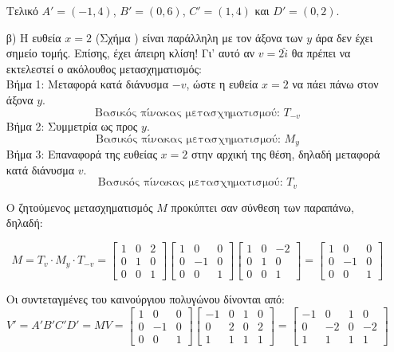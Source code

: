 \begin{solution}
\begin{enumerate}
Τελικό $A' = (-1, 4)$, $B' = (0, 6)$, $C' = (1, 4)$ και $D' = (0, 2)$.

    \item[β)] Η ευθεία $x=2$ (Σχήμα ) είναι παράλληλη με τον άξονα των $y$ άρα δεν έχει σημείο τομής. Επίσης, έχει άπειρη κλίση! Γι' αυτό αν $v = 2\hat{i}$ θα πρέπει να εκτελεστεί ο ακόλουθος μετασχηματισμός:\\
Βήμα 1: Μεταφορά κατά διάνυσμα $-v$, ώστε η ευθεία $x=2$ να πάει πάνω στον άξονα $y$. 
\[
\text{Βασικός πίνακας μετασχηματισμού: } T_{-v}
\]
Βήμα 2: Συμμετρία ως προς $y$.
\[
\text{Βασικός πίνακας μετασχηματισμού: } M_y
\]
Βήμα 3: Επαναφορά της ευθείας $x=2$ στην αρχική της θέση, δηλαδή μεταφορά κατά διάνυσμα $v$.
\[
\text{Βασικός πίνακας μετασχηματισμού: } T_v
\]

Ο ζητούμενος μετασχηματισμός $M$ προκύπτει σαν σύνθεση των παραπάνω, δηλαδή:

\[
M = T_v \cdot M_y \cdot T_{-v} = \begin{bmatrix}
1 & 0 & 2 \\
0 & 1 & 0 \\
0 & 0 & 1
\end{bmatrix}
\begin{bmatrix}
1 & 0 & 0 \\
0 & -1 & 0 \\
0 & 0 & 1
\end{bmatrix}
\begin{bmatrix}
1 & 0 & -2 \\
0 & 1 & 0 \\
0 & 0 & 1
\end{bmatrix} = \begin{bmatrix}
1 & 0 & 0 \\
0 & -1 & 0 \\
0 & 0 & 1
\end{bmatrix}
\]

Οι συντεταγμένες του καινούργιου πολυγώνου δίνονται από:
\[
V' = A'B'C'D' = MV = \begin{bmatrix}
1 & 0 & 0 \\
0 & -1 & 0 \\
0 & 0 & 1
\end{bmatrix}
\begin{bmatrix}
-1 & 0 & 1 & 0 \\
0 & 2 & 0 & 2 \\
1 & 1 & 1 & 1
\end{bmatrix} = \begin{bmatrix}
-1 & 0 & 1 & 0 \\
0 & -2 & 0 & -2 \\
1 & 1 & 1 & 1
\end{bmatrix}
\]


\end{enumerate}
\end{solution}
